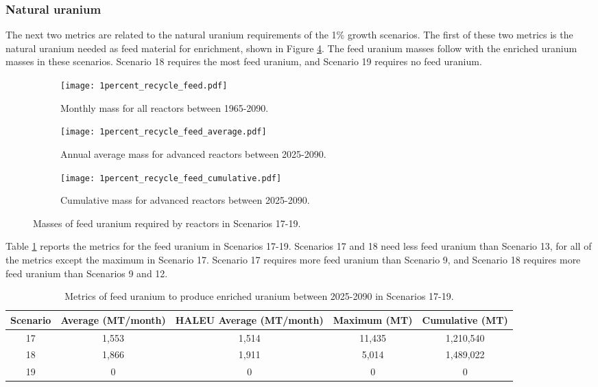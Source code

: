 \subsubsection{Natural uranium}
The next two metrics are related to the natural uranium requirements of 
the 1\% growth scenarios. The first of these two metrics is the 
natural uranium needed as feed material for enrichment, shown in 
Figure \ref{fig:1percent_recycle_feed}. The feed uranium masses follow with 
the enriched uranium masses in these scenarios. Scenario 18 requires 
the most feed uranium, and Scenario 19 requires no feed uranium. 

\begin{figure}[h!]
    \centering
    \begin{subfigure}[b]{0.45\textwidth}
        \centering
        \texttt{[image: 1percent\_recycle\_feed.pdf]}
        \caption{Monthly mass for all reactors 
        between 1965-2090.}
        \label{fig:1percent_recycle_all_feed}
    \end{subfigure}
    \hfill
    \begin{subfigure}[b]{0.45\textwidth}
        \centering
        \texttt{[image: 1percent\_recycle\_feed\_average.pdf]}
        \caption{Annual average mass for 
        advanced reactors between 2025-2090.}
        \label{fig:1percent_recycle_AR_feed}
    \end{subfigure}
    \begin{subfigure}[b]{0.45\textwidth}
        \centering
        \texttt{[image: 1percent\_recycle\_feed\_cumulative.pdf]}
        \caption{Cumulative mass for advanced reactors between 2025-2090.}
        \label{fig:1percent_recycle_feed_cumulative}
    \end{subfigure}
       \caption{Masses of feed uranium required by reactors
        in Scenarios 17-19.}
       \label{fig:1percent_recycle_feed}
\end{figure}

Table \ref{tab:s17-19_feed} reports the metrics for the feed uranium in 
Scenarios 17-19. Scenarios 17 and 18 need less feed uranium than 
Scenario 13, for all of the metrics except the maximum in Scenario 17. 
Scenario 17 requires more feed uranium than Scenario 9, and 
Scenario 18 requires more feed uranium than Scenarios 9 and 12. 

\begin{table}[h!]
    \centering 
    \caption{Metrics of feed uranium to produce enriched uranium 
    between 2025-2090 in Scenarios 17-19.}
    \label{tab:s17-19_feed}
    \begin{tabular}{c c c c c}
        \hline 
        Scenario & Average (MT/month) & HALEU Average (MT/month) & 
        Maximum (MT) & Cumulative (MT) \\
        \hline
        17 & 1,553 & 1,514 & 11,435 & 1,210,540\\
        18 & 1,866 & 1,911 & 5,014 & 1,489,022\\
        19 & 0 & 0 & 0 & 0\\
        \hline
    \end{tabular}
\end{table}

